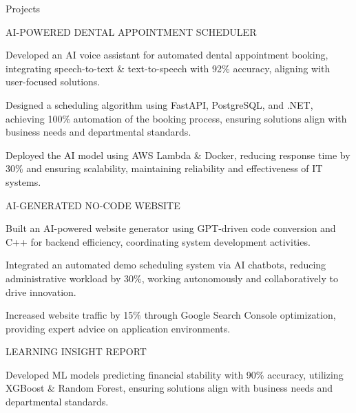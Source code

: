 \documentclass{resume} %
\begin{document}
    \begin{rSection}{Projects}
                    \begin{rSubsection}
                                    {AI{-}POWERED DENTAL APPOINTMENT SCHEDULER}
                                {}{}{}
                                    \item Developed an AI voice assistant for automated dental appointment booking, integrating speech{-}to{-}text \& text{-}to{-}speech with 92\% accuracy, aligning with user{-}focused solutions.
                                    \item Designed a scheduling algorithm using FastAPI, PostgreSQL, and .NET, achieving 100\% automation of the booking process, ensuring solutions align with business needs and departmental standards.
                                    \item Deployed the AI model using AWS Lambda \& Docker, reducing response time by 30\% and ensuring scalability, maintaining reliability and effectiveness of IT systems.
                            \end{rSubsection}
                    \begin{rSubsection}
                                    {AI{-}GENERATED NO{-}CODE WEBSITE}
                                {}{}{}
                                    \item Built an AI{-}powered website generator using GPT{-}driven code conversion and C++ for backend efficiency, coordinating system development activities.
                                    \item Integrated an automated demo scheduling system via AI chatbots, reducing administrative workload by 30\%, working autonomously and collaboratively to drive innovation.
                                    \item Increased website traffic by 15\% through Google Search Console optimization, providing expert advice on application environments.
                            \end{rSubsection}
                    \begin{rSubsection}
                                    {LEARNING INSIGHT REPORT}
                                {}{}{}
                                    \item Developed ML models predicting financial stability with 90\% accuracy, utilizing XGBoost \& Random Forest, ensuring solutions align with business needs and departmental standards.

\end{rSubsection}
\end{rSection}
\end{document}
